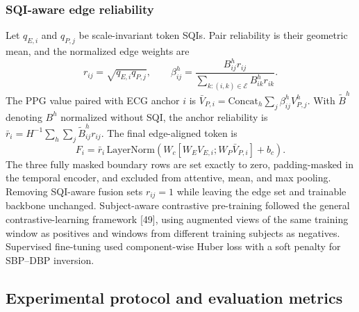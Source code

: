 \documentclass[preprint,12pt]{elsarticle}
\begin{document}
\subsubsection{SQI-aware edge reliability}

Let $q_{E,i}$ and $q_{P,j}$ be scale-invariant token SQIs. Pair reliability is their geometric mean, and the normalized edge weights are
\begin{equation}
r_{ij}=\sqrt{q_{E,i}q_{P,j}},\qquad
\beta^h_{ij}=\frac{B^h_{ij}r_{ij}}{\sum_{k:(i,k)\in\mathcal{E}}B^h_{ik}r_{ik}}.
\end{equation}
The PPG value paired with ECG anchor $i$ is $\bar V_{P,i}=\mathrm{Concat}_h\sum_j\beta^h_{ij}V^h_{P,j}$. With $\widetilde B^h$ denoting $B^h$ normalized without SQI, the anchor reliability is $\bar r_i=H^{-1}\sum_h\sum_j\widetilde B^h_{ij}r_{ij}$. The final edge-aligned token is
\begin{equation}
F_i=\bar r_i\,\mathrm{LayerNorm}\left(W_c[W_EV_{E,i};W_P\bar V_{P,i}]+b_c\right).
\end{equation}
The three fully masked boundary rows are set exactly to zero, padding-masked in the temporal encoder, and excluded from attentive, mean, and max pooling. Removing SQI-aware fusion sets $r_{ij}=1$ while leaving the edge set and trainable backbone unchanged. Subject-aware contrastive pre-training followed the general contrastive-learning framework [49], using augmented views of the same training window as positives and windows from different training subjects as negatives. Supervised fine-tuning used component-wise Huber loss with a soft penalty for SBP--DBP inversion.

\subsection{Experimental protocol and evaluation metrics}
\end{document}
